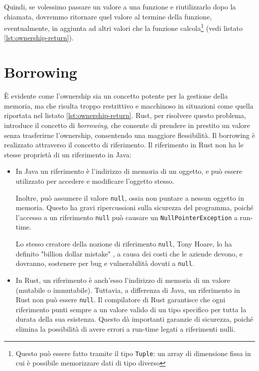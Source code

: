 Quindi, se volessimo passare un valore a una funzione e riutilizzarlo dopo la chiamata, dovremmo ritornare quel valore al termine della funzione, eventualmente, in aggiunta ad altri valori che la funzione calcola\footnote{Questo può essere fatto tramite il tipo \texttt{Tuple}: un array di dimensione fissa in cui è possibile memorizzare dati di tipo diverso} (vedi listato \ref{lst:ownership-return}). 

\section{Borrowing}
È evidente come l'ownership sia un concetto potente per la gestione della memoria, ma che risulta troppo restrittivo e macchinoso in situazioni come quella riportata nel listato \ref{lst:ownership-return}. Rust, per risolvere questo problema, introduce il concetto di \textit{borrowing}, che consente di prendere in prestito un valore senza trasferirne l'ownership, consentendo una maggiore flessibilità. Il borrowing è realizzato attraverso il concetto di riferimento. Il riferimento in Rust non ha le stesse proprietà di un riferimento in Java: 
\begin{itemize}
    \item In Java un riferimento è l'indirizzo di memoria di un oggetto, e può essere utilizzato per accedere e modificare l'oggetto stesso. 
    
    Inoltre, può assumere il valore \texttt{null}, ossia non puntare a nessun oggetto in memoria. Questo ha gravi ripercussioni sulla sicurezza del programma, poiché l'accesso a un riferimento \texttt{null} può causare un \texttt{NullPointerException} a run-time. 
    
    Lo stesso creatore della nozione di riferimento \texttt{null}, Tony Hoare, lo ha definito "billion dollar mistake" \cite{hoare-null-reference}, a causa dei costi che le aziende devono, e dovranno, sostenere per bug e vulnerabilità dovuti a \texttt{null}.
    \item In Rust, un riferimento è anch'esso l'indirizzo di memoria di un valore (mutabile o immutabile). Tuttavia, a differenza di Java, un riferimento in Rust non può essere \texttt{null}. Il compilatore di Rust garantisce che ogni riferimento punti sempre a un valore valido di un tipo specifico per tutta la durata della sua esistenza. Questo dà importanti garanzie di sicurezza, poiché elimina la possibilità di avere errori a run-time legati a riferimenti nulli.
\end{itemize}

